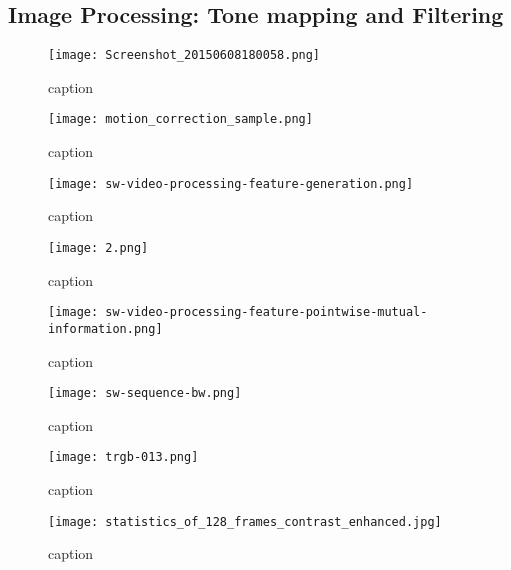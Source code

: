 \documentclass[../main.tex]{subfiles}
\begin{document}
\subsection{Image Processing: Tone mapping and
	Filtering}\label{image-processing-tonemapping-and-filtering}

\begin{figure}[htb]\centering
	\texttt{[image: Screenshot\_20150608180058.png]}
	\caption{caption}
\end{figure}

\begin{figure}[htb]\centering
	\texttt{[image: motion\_correction\_sample.png]}
	\caption{caption}
\end{figure}

\begin{figure}[htb]\centering
	\texttt{[image: sw-video-processing-feature-generation.png]}
	\caption{caption}
\end{figure}

\begin{figure}[htb]\centering
	\texttt{[image: 2.png]}
	\caption{caption}
\end{figure}

\begin{figure}[htb]\centering
	\texttt{[image: sw-video-processing-feature-pointwise-mutual-information.png]}
	\caption{caption}
\end{figure}

\begin{figure}[htb]\centering
	\texttt{[image: sw-sequence-bw.png]}
	\caption{caption}
\end{figure}

\begin{figure}[htb]\centering
	\texttt{[image: trgb-013.png]}
	\caption{caption}
\end{figure}

\begin{figure}[htb]\centering
	\texttt{[image: statistics\_of\_128\_frames\_contrast\_enhanced.jpg]}
	\caption{caption}
\end{figure}

\clearpage
\end{document}
